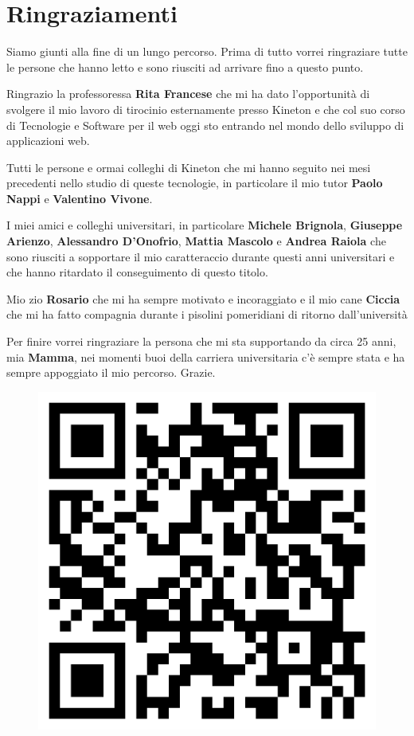 \chapter{Ringraziamenti}
Siamo giunti alla fine di un lungo percorso. Prima di tutto vorrei ringraziare tutte le persone che hanno letto e sono riusciti ad arrivare fino a questo punto.

Ringrazio la professoressa \textbf{Rita Francese} che mi ha dato l'opportunità di svolgere il mio lavoro di tirocinio esternamente presso Kineton e che col suo corso di Tecnologie e Software per il web oggi sto entrando nel mondo dello sviluppo di applicazioni web.

Tutti le persone e ormai colleghi di Kineton che mi hanno seguito nei mesi precedenti nello studio di queste tecnologie, in particolare il mio tutor \textbf{Paolo Nappi} e \textbf{Valentino Vivone}.

I miei amici e colleghi universitari, in particolare \textbf{Michele Brignola}, \textbf{Giuseppe Arienzo}, \textbf{Alessandro D'Onofrio}, \textbf{Mattia Mascolo} e \textbf{Andrea Raiola} che sono riusciti a sopportare il mio caratteraccio durante questi anni universitari e che hanno ritardato il conseguimento di questo titolo.

Mio zio \textbf{Rosario} che mi ha sempre motivato e incoraggiato e il mio cane \textbf{Ciccia} che mi ha fatto compagnia durante i pisolini pomeridiani di ritorno dall'università

Per finire vorrei ringraziare la persona che mi sta supportando da circa 25 anni, mia \textbf{Mamma}, nei momenti buoi della carriera universitaria c'è sempre stata e ha sempre appoggiato il mio percorso. Grazie.

\begin{figure}
    \centering
    \includegraphics[scale=0.10]{capitoli/immagini/thankyou.png}
\end{figure}

